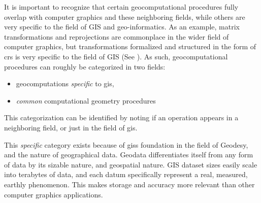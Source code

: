 It is important to recognize that certain geocomputational procedures fully overlap with computer graphics and these neighboring fields, while others are very specific to the field of GIS and geo-informatics.
As an example, matrix transformations and reprojections are commonplace in the wider field of computer graphics, but transformations formalized and structured in the form of \ac*{crs} is very specific to the field of GIS (See ).
As such, geocomputational procedures can roughly be categorized in two fields: 
\begin{itemize}[-]
  \item geocomputations \emph{specific} to \ac{gis},
  \item \emph{common} computational geometry procedures
\end{itemize}
This categorization can be identified by noting if an operation appears in a neighboring field, or just in the field of \ac{gis}.

This \emph{specific} category exists because of \ac{gis}s foundation in the field of Geodesy, and the nature of geographical data. 
Geodata differentiates itself from any form of data by its sizable nature, and geospatial nature. 
GIS dataset sizes easily scale into terabytes of data, and each datum specifically represent a real, measured, earthly phenomenon.
This makes storage and accuracy more relevant than other computer graphics applications. 





